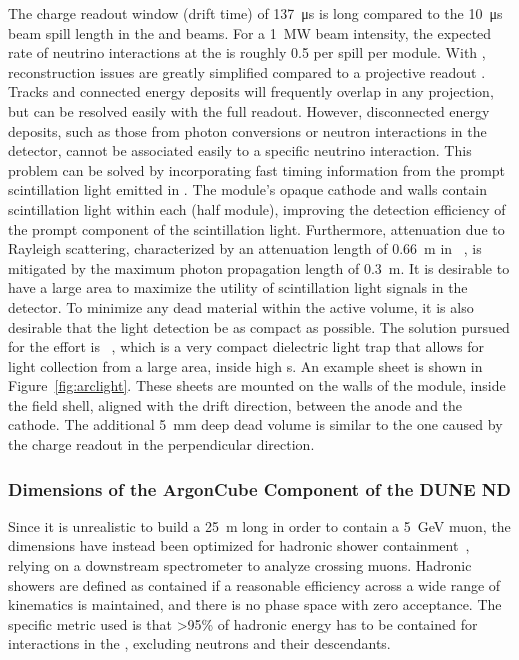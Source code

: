 The charge readout window (drift time) of \SI{137}{\micro\second} is long compared to the \SI{10}{\micro\second}~\cite{Adamson:2015dkw} beam spill length in the  and  beams.
For a \SI{1}{MW} beam intensity, the expected rate of neutrino interactions at the   is roughly 0.5 per spill per  module.  
With , reconstruction issues are greatly simplified compared to a projective readout .
Tracks and connected energy deposits will frequently overlap in any \twod projection, but can be resolved easily with the full \threed readout.
However, disconnected energy deposits, such as those from photon conversions or neutron interactions in the detector, cannot be associated easily to a specific neutrino interaction.
This problem can be solved by incorporating fast timing information from the prompt scintillation light emitted in .
The module's opaque cathode and walls contain scintillation light within each  (half module), improving the detection efficiency of the prompt component of the scintillation light. 
Furthermore, attenuation due to Rayleigh scattering, characterized by an attenuation length of \SI{0.66}{\metre} in ~\cite{Grace:2015yta}, is mitigated by the maximum photon propagation length of \SI{0.3}{\metre}. 
It is desirable to have a large area  to maximize the utility of scintillation light signals in the detector. 
To minimize any dead material within the active volume, it is also desirable that the light detection be as compact as possible. 
The solution pursued for the  effort is ~\cite{Auger:2017flc}, which is a very compact dielectric light trap that allows for light collection from a large area, inside high \efield{}s. 
An example  sheet is shown in Figure~\ref{fig:arclight}. These sheets are mounted on the walls of the module, inside the field shell, aligned with the drift direction, between the anode and the cathode. 
The additional \SI{5}{\milli\metre} deep dead volume is similar to the one caused by the charge readout in the perpendicular direction.

\subsubsection{Dimensions of the ArgonCube Component of the DUNE  ND}\label{sec:appx-nd:had_containment}

Since it is unrealistic to build a \SI{25}{\metre} long  in order to contain a \SI{5}{\giga\electronvolt} muon, the  dimensions have instead been optimized for hadronic shower containment~\cite{lartpcSizeChris}, relying on a downstream spectrometer to analyze crossing muons.
Hadronic showers are defined as contained if a reasonable efficiency across a wide range of kinematics is maintained, and there is no phase space with zero acceptance. 
The specific metric used is that \textgreater95\% of hadronic energy has to be contained for interactions in the , excluding neutrons and their descendants.

